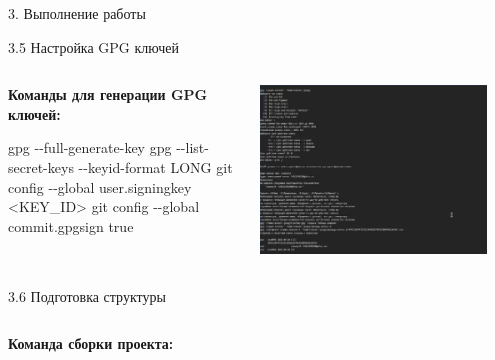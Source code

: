 \documentclass[
  ignorenonframetext,
  aspectratio=169,
]{beamer}
\newenvironment{Shaded}{\begin{snugshade}}{\end{snugshade}}
\newcommand{\AttributeTok}[1]{\textcolor[rgb]{0.40,0.45,0.13}{#1}}
\newcommand{\ExtensionTok}[1]{\textcolor[rgb]{0.00,0.23,0.31}{#1}}
\newcommand{\FunctionTok}[1]{\textcolor[rgb]{0.28,0.35,0.67}{#1}}
\newcommand{\NormalTok}[1]{\textcolor[rgb]{0.00,0.23,0.31}{#1}}
\newcommand{\OperatorTok}[1]{\textcolor[rgb]{0.37,0.37,0.37}{#1}}
\begin{document}
\begin{frame}[fragile]{3. Выполнение работы}
\begin{block}{3.5 Настройка GPG ключей}
\label{ux43dux430ux441ux442ux440ux43eux439ux43aux430-gpg-ux43aux43bux44eux447ux435ux439}
\begin{columns}[c]
\begin{column}{0.6\textwidth}
\textbf{Команды для генерации GPG ключей:}

\begin{Shaded}
\begin{Highlighting}[]
\ExtensionTok{gpg} \AttributeTok{{-}{-}full{-}generate{-}key}
\ExtensionTok{gpg} \AttributeTok{{-}{-}list{-}secret{-}keys} \AttributeTok{{-}{-}keyid{-}format}\NormalTok{ LONG}
\FunctionTok{git}\NormalTok{ config }\AttributeTok{{-}{-}global}\NormalTok{ user.signingkey }\OperatorTok{\textless{}}\NormalTok{KEY\_ID}\OperatorTok{\textgreater{}}
\FunctionTok{git}\NormalTok{ config }\AttributeTok{{-}{-}global}\NormalTok{ commit.gpgsign true}
\end{Highlighting}
\end{Shaded}
\end{column}

\begin{column}{0.4\textwidth}
\includegraphics[width=0.9\textwidth,height=\textheight]{./image/gpg.png}
\end{column}
\end{columns}
\end{block}

\begin{block}{3.6 Подготовка структуры}
\label{ux43fux43eux434ux433ux43eux442ux43eux432ux43aux430-ux441ux442ux440ux443ux43aux442ux443ux440ux44b}
\begin{columns}[c]
\begin{column}{0.6\textwidth}
\textbf{Команда сборки проекта:}


\end{column}
\end{columns}
\end{block}
\end{frame}
\end{document}

